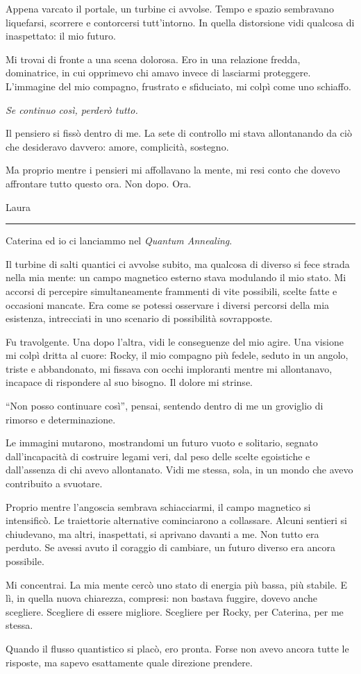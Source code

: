 Appena varcato il portale, un turbine ci avvolse. Tempo e spazio sembravano liquefarsi, scorrere e contorcersi tutt'intorno. In quella distorsione vidi qualcosa di inaspettato: il mio futuro.

Mi trovai di fronte a una scena dolorosa. Ero in una relazione fredda, dominatrice, in cui opprimevo chi amavo invece di lasciarmi proteggere. L’immagine del mio compagno, frustrato e sfiduciato, mi colpì come uno schiaffo.

\textit{Se continuo così, perderò tutto.}

Il pensiero si fissò dentro di me. La sete di controllo mi stava allontanando da ciò che desideravo davvero: amore, complicità, sostegno.

Ma proprio mentre i pensieri mi affollavano la mente, mi resi conto che dovevo affrontare tutto questo ora. Non dopo. Ora.



\newpage
\vspace{1em}
\begin{center}Laura\end{center}
\hrule
\vspace{1em}

Caterina ed io ci lanciammo nel \textit{Quantum Annealing}.

Il turbine di salti quantici ci avvolse subito, ma qualcosa di diverso si fece strada nella mia mente: un campo magnetico esterno stava modulando il mio stato. Mi accorsi di percepire simultaneamente frammenti di vite possibili, scelte fatte e occasioni mancate. Era come se potessi osservare i diversi percorsi della mia esistenza, intrecciati in uno scenario di possibilità sovrapposte.

Fu travolgente. Una dopo l'altra, vidi le conseguenze del mio agire. Una visione mi colpì dritta al cuore: Rocky, il mio compagno più fedele, seduto in un angolo, triste e abbandonato, mi fissava con occhi imploranti mentre mi allontanavo, incapace di rispondere al suo bisogno. Il dolore mi strinse.

\enquote{Non posso continuare così}, pensai, sentendo dentro di me un groviglio di rimorso e determinazione.

Le immagini mutarono, mostrandomi un futuro vuoto e solitario, segnato dall'incapacità di costruire legami veri, dal peso delle scelte egoistiche e dall'assenza di chi avevo allontanato. Vidi me stessa, sola, in un mondo che avevo contribuito a svuotare.

Proprio mentre l’angoscia sembrava schiacciarmi, il campo magnetico si intensificò. Le traiettorie alternative cominciarono a collassare. Alcuni sentieri si chiudevano, ma altri, inaspettati, si aprivano davanti a me. Non tutto era perduto. Se avessi avuto il coraggio di cambiare, un futuro diverso era ancora possibile.

Mi concentrai. La mia mente cercò uno stato di energia più bassa, più stabile. E lì, in quella nuova chiarezza, compresi: non bastava fuggire, dovevo anche scegliere. Scegliere di essere migliore. Scegliere per Rocky, per Caterina, per me stessa.

Quando il flusso quantistico si placò, ero pronta. Forse non avevo ancora tutte le risposte, ma sapevo esattamente quale direzione prendere.

